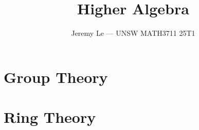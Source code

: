 \documentclass[12pt, letterpaper]{article}
\title{\textbf{Higher Algebra}}
\author{Jeremy Le --- UNSW MATH3711 25T1}
\date{}
\theoremstyle{definition}
\begin{document}
\maketitle
\tableofcontents
\newpage

\part{Group Theory}

















\part{Ring Theory}

\end{document}
